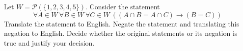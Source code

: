 
Let $W = \mathcal{P}( \{ 1,2,3,4,5\})$. Consider the statement 
\[
\forall A \in W~ \forall B \in W ~ \forall C \in W~ ((A \cap B = A \cap C) \to (B=C) )
\]
Translate the statement to English.
Negate the statement 
and translating this negation to English.
Decide whether the original statements or its negation is true
and justify your decision.
